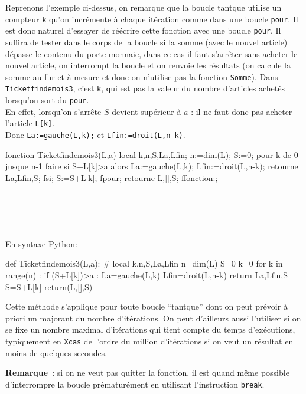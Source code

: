 \documentclass[12pt,a4paper]{book}
\begin{document}
\begin{giacjshere}
Reprenons l'exemple ci-dessus,
on remarque que la boucle tantque utilise un compteur {\tt k}
qu'on incr\'emente \`a chaque it\'eration comme dans une boucle {\tt pour}.
Il est donc naturel d'essayer de r\'e\'ecrire cette fonction avec
une boucle {\tt pour}. Il suffira de tester dans le corps de 
la boucle si la somme (avec le nouvel article)
d\'epasse le contenu du porte-monnaie, dans ce cas il faut s'arr\^eter
sans acheter le nouvel article, on interrompt la boucle et on renvoie les
r\'esultats (on calcule la somme au fur et \`a mesure et donc on n'utilise pas 
la fonction {\tt Somme}).
Dans {\tt Ticketfindemois3}, c'est  {\tt k}, qui est pas la 
valeur du nombre d'articles achet\'es lorsqu'on sort du {\tt pour}.\\
En effet, lorsqu'on s'arr\^ete  $S$ devient 
sup\'erieur \`a $a$ : il ne faut donc pas acheter l'article {\tt L[k]}.\\
Donc {\tt La:=gauche(L,k);} et {\tt Lfin:=droit(L,n-k)}.\\
\begin{giaconload}
fonction Ticketfindemois3(L,a)
  local k,n,S,La,Lfin;
  n:=dim(L);
  S:=0;
  pour k de 0 jusque n-1 faire
    si S+L[k]>a alors 
      La:=gauche(L,k);
      Lfin:=droit(L,n-k);
      retourne La,Lfin,S;
    fsi;
    S:=S+L[k];
  fpour;
  retourne L,[],S;
ffonction:;
\end{giaconload}
\\
\\
\\
\\
En syntaxe Python:
\begin{giacprog}
def Ticketfindemois3(L,a):
    # local k,n,S,La,Lfin
    n=dim(L)
    S=0
    k=0
    for k in range(n) :        
        if (S+L[k])>a :
            La=gauche(L,k)
            Lfin=droit(L,n-k)
            return La,Lfin,S
        S=S+L[k]
    return(L,[],S)
\end{giacprog}

Cette m\'ethode s'applique pour toute boucle ``tantque'' dont on peut
pr\'evoir \`a priori un majorant du nombre d'it\'erations. On peut
d'ailleurs aussi l'utiliser si on se fixe un nombre maximal d'it\'erations
qui tient compte du temps d'ex\'ecutions, typiquement en {\tt Xcas}
de l'ordre du million d'it\'erations si on veut un
r\'esultat en moins de quelques secondes.

{\bf Remarque}~: si on ne veut pas quitter la fonction, il est quand m\^eme
possible d'interrompre la boucle pr\'ematur\'ement 
en utilisant l'instruction {\tt break}.



\end{giacjshere}
\end{document}
